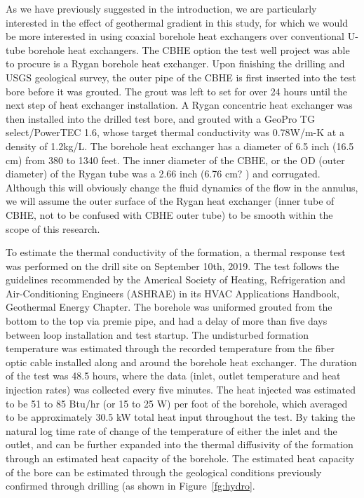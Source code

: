 	As we have previously suggested in the introduction, we are particularly interested in the effect of geothermal gradient in this study, for which we would be more interested in using coaxial borehole heat exchangers over conventional U-tube borehole heat exchangers. The CBHE option the test well project was able to procure is a Rygan borehole heat exchanger. Upon finishing the drilling and USGS geological survey, the outer pipe of the CBHE is first inserted into the test bore before it was grouted. The grout was left to set for over 24 hours until the next step of heat exchanger installation. 
	A Rygan concentric heat exchanger was then installed into the drilled test bore, and grouted with a GeoPro TG select/PowerTEC 1.6, whose target thermal conductivity was 0.78W/m-K at a density of 1.2kg/L. The borehole heat exchanger has a diameter of 6.5 inch (16.5 cm) from 380 to 1340 feet. The inner diameter of the CBHE, or the OD (outer diameter) of the Rygan tube was a 2.66 inch (6.76 cm? ) and corrugated. Although this will obviously change the fluid dynamics of the flow in the annulus, we will assume the outer surface of the Rygan heat exchanger (inner tube of CBHE, not to be confused with CBHE outer tube) to be smooth within the scope of this research.
	
	
	To estimate the thermal conductivity of the formation, a thermal response test was performed on the drill site on September 10th, 2019. The test follows the guidelines recommended by the Americal Society of Heating, Refrigeration and Air-Conditioning Engineers (ASHRAE) in its HVAC Applications Handbook, Geothermal Energy Chapter. The borehole was uniformed grouted from the bottom to the top via premie pipe, and had a delay of more than five days between loop installation and test startup. The undisturbed formation temperature was estimated through the recorded temperature from the fiber optic cable installed along and around the borehole heat exchanger. The duration of the test was 48.5 hours, where the data (inlet, outlet temperature and heat injection rates) was collected every five minutes.  The heat injected was estimated to be 51 to 85 Btu/hr (or 15 to 25 W) per foot of the borehole, which averaged to be approximately 30.5 kW total heat input throughout the test. By taking the natural log time rate of change of the temperature of either the inlet and the outlet, and can be further expanded into the thermal diffusivity of the formation through an estimated heat capacity of the borehole. The estimated heat capacity of the bore can be estimated through the geological conditions previously confirmed through drilling (as shown in Figure~\ref{fg:hydro}. 	
	
